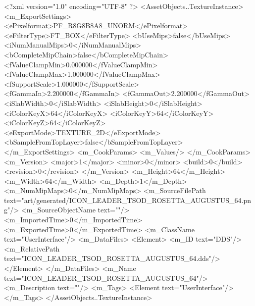 <?xml version="1.0" encoding="UTF-8" ?>
<AssetObjects..TextureInstance>
	<m_ExportSettings>
		<ePixelformat>PF_R8G8B8A8_UNORM</ePixelformat>
		<eFilterType>FT_BOX</eFilterType>
		<bUseMips>false</bUseMips>
		<iNumManualMips>0</iNumManualMips>
		<bCompleteMipChain>false</bCompleteMipChain>
		<fValueClampMin>0.000000</fValueClampMin>
		<fValueClampMax>1.000000</fValueClampMax>
		<fSupportScale>1.000000</fSupportScale>
		<fGammaIn>2.200000</fGammaIn>
		<fGammaOut>2.200000</fGammaOut>
		<iSlabWidth>0</iSlabWidth>
		<iSlabHeight>0</iSlabHeight>
		<iColorKeyX>64</iColorKeyX>
		<iColorKeyY>64</iColorKeyY>
		<iColorKeyZ>64</iColorKeyZ>
		<eExportMode>TEXTURE_2D</eExportMode>
		<bSampleFromTopLayer>false</bSampleFromTopLayer>
	</m_ExportSettings>
	<m_CookParams>
		<m_Values/>
	</m_CookParams>
	<m_Version>
		<major>1</major>
		<minor>0</minor>
		<build>0</build>
		<revision>0</revision>
	</m_Version>
	<m_Height>64</m_Height>
	<m_Width>64</m_Width>
	<m_Depth>1</m_Depth>
	<m_NumMipMaps>0</m_NumMipMaps>
	<m_SourceFilePath text="art/generated/ICON_LEADER_TSOD_ROSETTA_AUGUSTUS_64.png"/>
	<m_SourceObjectName text=""/>
	<m_ImportedTime>0</m_ImportedTime>
	<m_ExportedTime>0</m_ExportedTime>
	<m_ClassName text="UserInterface"/>
	<m_DataFiles>
		<Element>
			<m_ID text="DDS"/>
			<m_RelativePath text="ICON_LEADER_TSOD_ROSETTA_AUGUSTUS_64.dds"/>
		</Element>
	</m_DataFiles>
	<m_Name text="ICON_LEADER_TSOD_ROSETTA_AUGUSTUS_64"/>
	<m_Description text=""/>
	<m_Tags>
		<Element text="UserInterface"/>
	</m_Tags>
</AssetObjects..TextureInstance>
